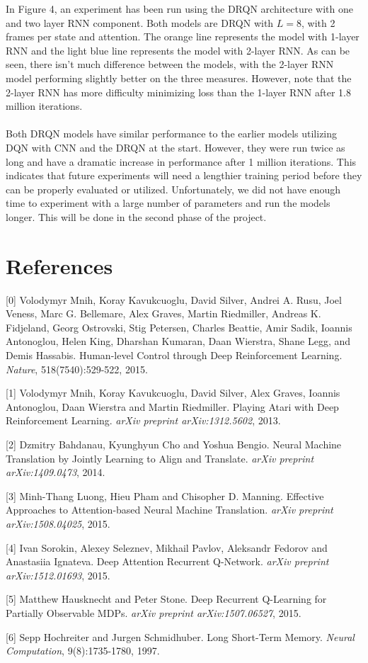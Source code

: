 \documentclass{article}
\begin{document}
In Figure 4, an experiment has been run using the DRQN architecture with one and two layer RNN component. Both models are DRQN with $L = 8$, with 2 frames per state and attention. The orange line represents the model with 1-layer RNN and the light blue line represents the model with 2-layer RNN. As can be seen, there isn't much difference between the models, with the 2-layer RNN model performing slightly better on the three measures. However, note that the 2-layer RNN has more difficulty minimizing loss than the 1-layer RNN after 1.8 million iterations. \\
\\
Both DRQN models have similar performance to the earlier models utilizing DQN with CNN and the DRQN at the start. However, they were run twice as long and have a dramatic increase in performance after 1 million iterations. This indicates that future experiments will need a lengthier training period before they can be properly evaluated or utilized. Unfortunately, we did not have
enough time to experiment with a large number of parameters and run the models longer. This will be done in the second phase of the project.

\section*{References}
\small
[0] Volodymyr Mnih, Koray Kavukcuoglu, David Silver, Andrei A. Rusu, Joel Veness, Marc G. Bellemare, Alex Graves, Martin Riedmiller, Andreas K. Fidjeland, Georg Ostrovski, Stig Petersen, Charles Beattie, Amir Sadik, Ioannis Antonoglou, Helen King, Dharshan Kumaran, Daan Wierstra, Shane Legg, and Demis Hassabis. Human-level Control through Deep Reinforcement Learning. {\it Nature}, 518(7540):529-522, 2015.

[1] Volodymyr Mnih, Koray Kavukcuoglu, David Silver, Alex Graves, Ioannis Antonoglou, Daan Wierstra and Martin Riedmiller. Playing Atari with Deep Reinforcement Learning. {\it arXiv preprint arXiv:1312.5602}, 2013.

[2] Dzmitry Bahdanau, Kyunghyun Cho and Yoshua Bengio. Neural Machine Translation by Jointly Learning to Align and Translate. {\it arXiv preprint arXiv:1409.0473}, 2014.

[3] Minh-Thang Luong, Hieu Pham and Chisopher D. Manning. Effective Approaches to Attention-based Neural Machine Translation. {\it arXiv preprint arXiv:1508.04025}, 2015.

[4] Ivan Sorokin, Alexey Seleznev, Mikhail Pavlov, Aleksandr Fedorov and Anastasiia Ignateva. Deep Attention Recurrent Q-Network. {\it arXiv preprint arXiv:1512.01693}, 2015.

[5] Matthew Hausknecht and Peter Stone. Deep Recurrent Q-Learning for Partially Observable MDPs. {\it arXiv preprint arXiv:1507.06527}, 2015.

[6] Sepp Hochreiter and Jurgen Schmidhuber. Long Short-Term Memory. {\it Neural Computation}, 9(8):1735-1780, 1997.
\end{document}
